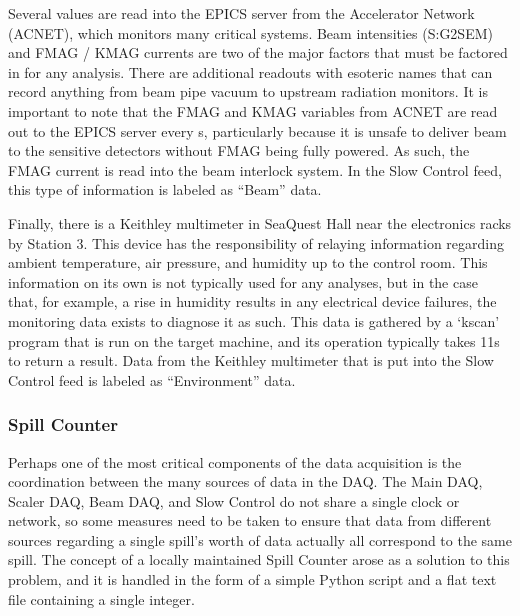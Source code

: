 Several values are read into the EPICS server from the Accelerator Network (ACNET), which monitors many critical systems. Beam intensities (S:G2SEM) and FMAG / KMAG currents are two of the major factors that must be factored in for any analysis. There are additional readouts with esoteric names that can record anything from beam pipe vacuum to upstream radiation monitors. It is important to note that the FMAG and KMAG variables from ACNET are read out to the EPICS server every \unit[3]{s}, particularly because it is unsafe to deliver beam to the sensitive detectors without FMAG being fully powered. As such, the FMAG current is read into the beam interlock system. In the Slow Control feed, this type of information is labeled as ``Beam'' data.

Finally, there is a Keithley multimeter \CN in SeaQuest Hall near the electronics racks by Station 3. This device has the responsibility of relaying information regarding ambient temperature, air pressure, and humidity up to the control room. This information on its own is not typically used for any analyses, but in the case that, for example, a rise in humidity results in any electrical device failures, the monitoring data exists to diagnose it as such. This data is gathered by a `kscan' program that is run on the target machine, and its operation typically takes 11s to return a result. Data from the Keithley multimeter that is put into the Slow Control feed is labeled as ``Environment'' data.

\subsubsection{Spill Counter}

Perhaps one of the most critical components of the data acquisition is the coordination between the many sources of data in the DAQ. The Main DAQ, Scaler DAQ, Beam DAQ, and Slow Control do not share a single clock or network, so some measures need to be taken to ensure that data from different sources regarding a single spill's worth of data actually all correspond to the same spill. The concept of a locally maintained Spill Counter arose as a solution to this problem, and it is handled in the form of a simple Python script and a flat text file containing a single integer.


